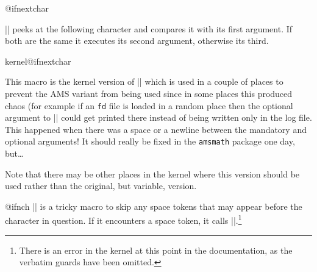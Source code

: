 \begin{docCommand}{@ifnextchar}{}

  |\@ifnextchar| peeks at the following character and compares it
  with its first argument. If both are the same it executes its
  second argument, otherwise its third.
\begin{teX}
\long{}
\end{teX}
\end{docCommand}

\begin{docCommand}{kernel@ifnextchar}{}

    This macro is the kernel version of |\@ifnextchar| which is used
    in a couple of places to prevent the AMS variant from being used
    since in some places this produced chaos (for example
    if an \texttt{fd} file
    is loaded in a random place then the optional argument to
    |\ProvidesFile| could get printed there instead of being written
    only in the log file.  This happened
    when there was a space or a newline between the mandatory and
    optional arguments! It should really be fixed in the
    \texttt{amsmath} package one day, but\ldots

    Note that there may be other places in the kernel where this version
    should be used rather than the original, but variable, version.

\begin{teX}
\let\kernel@ifnextchar\@ifnextchar
\end{teX}
\end{docCommand}
%
%
\begin{docCommand}{@ifnch}{}
    |\@ifnch| is a tricky macro to skip any space tokens that may
    appear before the character in question. If it encounters a space
    token, it calls |\@xifnch|.\footnote{There is an error in the kernel at this point in the documentation, as the
    verbatim guards have been omitted.}

\begin{teX}
\def\@ifnch{%
  \ifx\@let@token\@sptoken
    \let\reserved@c\@xifnch
  \else
    \ifx\@let@token\reserved@d
      \let\reserved@c\reserved@a
    \else
      \let\reserved@c\reserved@b
    \fi
  \fi
  \reserved@c}
\end{teX}
\end{docCommand}
%

